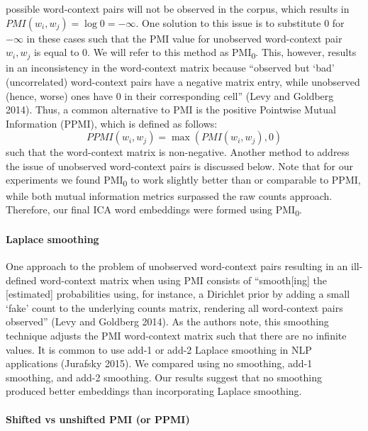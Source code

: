 \documentclass{article}
\begin{document}
possible word-context pairs will not be observed in the corpus, which
results in \(PMI(w_i, w_j) = \log0 = - \infty\). One solution to this
issue is to substitute 0 for \(- \infty\) in these cases such that the
PMI value for unobserved word-context pair \(w_i, w_j\) is equal to 0.
We will refer to this method as PMI\textsubscript{0}. This, however,
results in an inconsistency in the word-context matrix because
``observed but `bad' (uncorrelated) word-context pairs have a negative
matrix entry, while unobserved (hence, worse) ones have 0 in their
corresponding cell'' (Levy and Goldberg 2014). Thus, a common
alternative to PMI is the positive Pointwise Mutual Information (PPMI),
which is defined as follows: \[PPMI(w_i, w_j) = \max(PMI(w_i, w_j), 0)\]
such that the word-context matrix is non-negative. Another method to
address the issue of unobserved word-context pairs is discussed below.
Note that for our experiments we found PMI\textsubscript{0} to work
slightly better than or comparable to PPMI, while both mutual
information metrics surpassed the raw counts approach. Therefore, our
final ICA word embeddings were formed using PMI\textsubscript{0}.

\hypertarget{laplace-smoothing}{%
\paragraph{Laplace smoothing}\label{laplace-smoothing}}

One approach to the problem of unobserved word-context pairs resulting
in an ill-defined word-context matrix when using PMI consists of
``smooth{[}ing{]} the {[}estimated{]} probabilities using, for instance,
a Dirichlet prior by adding a small `fake' count to the underlying
counts matrix, rendering all word-context pairs observed'' (Levy and
Goldberg 2014). As the authors note, this smoothing technique adjusts
the PMI word-context matrix such that there are no infinite values. It
is common to use add-1 or add-2 Laplace smoothing in NLP applications
(Jurafsky 2015). We compared using no smoothing, add-1 smoothing, and
add-2 smoothing. Our results suggest that no smoothing produced better
embeddings than incorporating Laplace smoothing.

\hypertarget{shifted-vs-unshifted-pmi-or-ppmi}{%
\paragraph{Shifted vs unshifted PMI (or
PPMI)}\label{shifted-vs-unshifted-pmi-or-ppmi}}
\end{document}
